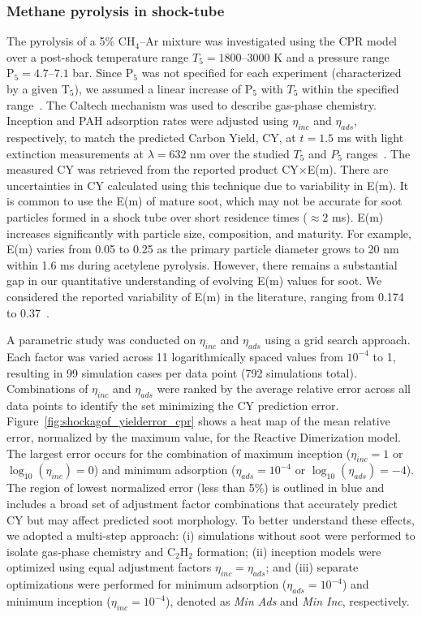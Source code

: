 \subsubsection{Methane pyrolysis in shock-tube}

The pyrolysis of a 5\% $\mathrm{CH_4}$--Ar mixture was investigated using the CPR model over a post-shock temperature range ${T_5} = 1800$--$3000$ K and a pressure range $\mathrm{P_5} = 4.7$--$7.1$ bar. Since $\mathrm{P_5}$ was not specified for each experiment (characterized by a given $\mathrm{T_5}$), we assumed a linear increase of $\mathrm{P_5}$ with ${T_5}$ within the specified range~\citep{agafonov2016unified}. The Caltech mechanism was used to describe gas-phase chemistry. Inception and PAH adsorption rates were adjusted using $\eta_{inc}$ and $\eta_{ads}$, respectively, to match the predicted Carbon Yield, CY, at $t = 1.5$ ms with light extinction measurements at $\lambda = 632$ nm over the studied ${T_5}$ and ${P_5}$ ranges~\citep{agafonov2016unified}. The measured CY was retrieved from the reported product CY$\times$E(m). There are uncertainties in CY calculated using this technique due to variability in E(m). It is common to use the E(m) of mature soot, which may not be accurate for soot particles formed in a shock tube over short residence times ($\approx 2$ ms). E(m) increases significantly with particle size, composition, and maturity. For example, E(m) varies from 0.05 to 0.25 as the primary particle diameter grows to 20 nm within 1.6 ms during acetylene pyrolysis. However, there remains a substantial gap in our quantitative understanding of evolving E(m) values for soot. We considered the reported variability of E(m) in the literature, ranging from 0.174~\citep{lee1981optical} to 0.37~\citep{agafonov2011soot}.

A parametric study was conducted on $\eta_{inc}$ and $\eta_{ads}$ using a grid search approach. Each factor was varied across 11 logarithmically spaced values from $10^{-4}$ to 1, resulting in 99 simulation cases per data point (792 simulations total). Combinations of $\eta_{inc}$ and $\eta_{ads}$ were ranked by the average relative error across all data points to identify the set minimizing the CY prediction error. Figure~\ref{fig:shockagof_yielderror_cpr} shows a heat map of the mean relative error, normalized by the maximum value, for the Reactive Dimerization model. The largest error occurs for the combination of maximum inception ($\eta_{inc} = 1$ or $\log_{10}(\eta_{inc}) = 0$) and minimum adsorption ($\eta_{ads} = 10^{-4}$ or $\log_{10}(\eta_{ads}) = -4$). The region of lowest normalized error (less than 5\%) is outlined in blue and includes a broad set of adjustment factor combinations that accurately predict CY but may affect predicted soot morphology. To better understand these effects, we adopted a multi-step approach: (i) simulations without soot were performed to isolate gas-phase chemistry and $\mathrm{C_2H_2}$ formation; (ii) inception models were optimized using equal adjustment factors $\eta_{inc} = \eta_{ads}$; and (iii) separate optimizations were performed for minimum adsorption ($\eta_{ads} = 10^{-4}$) and minimum inception ($\eta_{inc} = 10^{-4}$), denoted as \textit{Min Ads} and \textit{Min Inc}, respectively.

